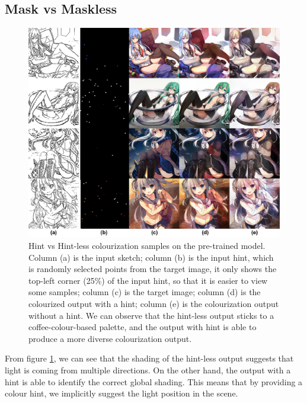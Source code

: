 \subsection{Mask vs Maskless}
\begin{figure}
    \centering
    \includegraphics[width=1.0\textwidth]{images/colorization/mask_vs_maskless.png}
    \caption{Hint vs Hint-less colourization samples on the pre-trained model. Column (a) is the input sketch; column (b) is the input hint, which is randomly selected points from the target image, it only shows the top-left corner (25\%) of the input hint, so that it is easier to view some samples; column (c) is the  target image; column (d) is the colourized output with a hint; column (e) is the colourization output without a hint. We can observe that the hint-less output sticks to a coffee-colour-based palette, and the output with hint is able to produce a more diverse colourization output.}
    \label{fig:mask_vs_maskless}
\end{figure}

From figure \ref{fig:mask_vs_maskless}, we can see that the shading of the hint-less output suggests that light is coming from multiple directions. On the other hand, the output with a hint is able to identify the correct global shading. This means that by providing a colour hint, we implicitly suggest the light position in the scene.

